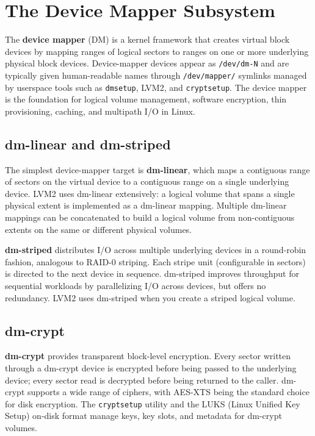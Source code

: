 \section{The Device Mapper Subsystem}
\label{sec:device-mapper}

The \textbf{device mapper} (DM) is a kernel framework that creates virtual block devices by mapping ranges of logical sectors to ranges on one or more underlying physical block devices. Device-mapper devices appear as \texttt{/dev/dm-N} and are typically given human-readable names through \texttt{/dev/mapper/} symlinks managed by userspace tools such as \texttt{dmsetup}, LVM2, and \texttt{cryptsetup}. The device mapper is the foundation for logical volume management, software encryption, thin provisioning, caching, and multipath I/O in Linux.

\subsection{dm-linear and dm-striped}

The simplest device-mapper target is \textbf{dm-linear}, which maps a contiguous range of sectors on the virtual device to a contiguous range on a single underlying device. LVM2 uses dm-linear extensively: a logical volume that spans a single physical extent is implemented as a dm-linear mapping. Multiple dm-linear mappings can be concatenated to build a logical volume from non-contiguous extents on the same or different physical volumes.

\textbf{dm-striped} distributes I/O across multiple underlying devices in a round-robin fashion, analogous to RAID-0 striping. Each stripe unit (configurable in sectors) is directed to the next device in sequence. dm-striped improves throughput for sequential workloads by parallelizing I/O across devices, but offers no redundancy. LVM2 uses dm-striped when you create a striped logical volume.

\subsection{dm-crypt}

\textbf{dm-crypt} provides transparent block-level encryption. Every sector written through a dm-crypt device is encrypted before being passed to the underlying device; every sector read is decrypted before being returned to the caller. dm-crypt supports a wide range of ciphers, with AES-XTS being the standard choice for disk encryption. The \texttt{cryptsetup} utility and the LUKS (Linux Unified Key Setup) on-disk format manage keys, key slots, and metadata for dm-crypt volumes.

